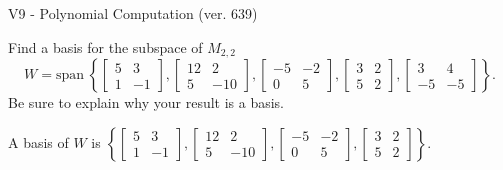 \begin{exercise}
  \begin{exerciseTitle}V9 - Polynomial Computation (ver. 639)\end{exerciseTitle}
  \begin{exerciseStatement}
    Find a basis for the subspace of \(M_{2,2}\) 
\[W=\mathrm{span}\ \left\{\left[\begin{array}{cc}
5 & 3 \\
1 & -1
\end{array}\right] , \left[\begin{array}{cc}
12 & 2 \\
5 & -10
\end{array}\right] , \left[\begin{array}{cc}
-5 & -2 \\
0 & 5
\end{array}\right] , \left[\begin{array}{cc}
3 & 2 \\
5 & 2
\end{array}\right] , \left[\begin{array}{cc}
3 & 4 \\
-5 & -5
\end{array}\right]\right\}.\]
 Be sure to explain why your result is a basis.


  \end{exerciseStatement}
  \begin{exerciseAnswer}
   A basis of \(W\) is  \(\left\{\left[\begin{array}{cc}
5 & 3 \\
1 & -1
\end{array}\right] , \left[\begin{array}{cc}
12 & 2 \\
5 & -10
\end{array}\right] , \left[\begin{array}{cc}
-5 & -2 \\
0 & 5
\end{array}\right] , \left[\begin{array}{cc}
3 & 2 \\
5 & 2
\end{array}\right]\right\}\).
  


  \end{exerciseAnswer}
\end{exercise}